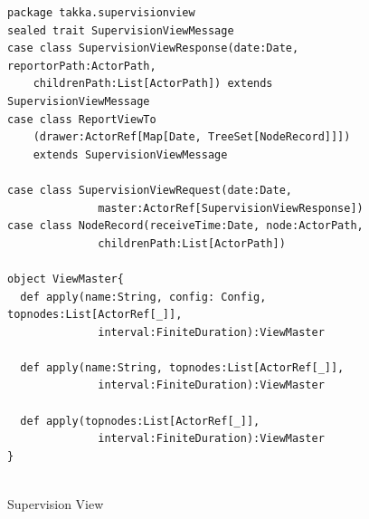 \begin{figure}[!h]

\begin{lstlisting}
package takka.supervisionview
sealed trait SupervisionViewMessage
case class SupervisionViewResponse(date:Date, reportorPath:ActorPath, 
    childrenPath:List[ActorPath]) extends SupervisionViewMessage
case class ReportViewTo
    (drawer:ActorRef[Map[Date, TreeSet[NodeRecord]]]) 
    extends SupervisionViewMessage

case class SupervisionViewRequest(date:Date,  
              master:ActorRef[SupervisionViewResponse])
case class NodeRecord(receiveTime:Date, node:ActorPath, 
              childrenPath:List[ActorPath]) 

object ViewMaster{
  def apply(name:String, config: Config, topnodes:List[ActorRef[_]], 
              interval:FiniteDuration):ViewMaster
  
  def apply(name:String, topnodes:List[ActorRef[_]], 
              interval:FiniteDuration):ViewMaster
  
  def apply(topnodes:List[ActorRef[_]], 
              interval:FiniteDuration):ViewMaster
}


\end{lstlisting}
\caption{Supervision View}
\label{supervision_view}
\end{figure}

